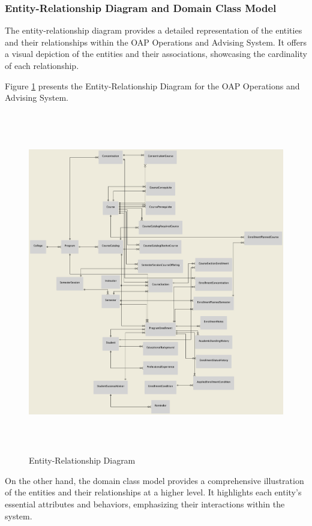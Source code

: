 \documentclass[12pt]{article}
\begin{document}
\subsubsection{Entity-Relationship Diagram and Domain Class Model}
The entity-relationship diagram provides a detailed representation of the entities and their relationships within the OAP Operations and Advising System. It offers a visual depiction of the entities and their associations, showcasing the cardinality of each relationship.

Figure \ref{fig:entity_relationship_diagram} presents the Entity-Relationship Diagram for the OAP Operations and Advising System.

\begin{figure}[ht]
    \centering
    \includegraphics[width=15cm,height=15cm]{entity-relationship-diagram}
    \caption{Entity-Relationship Diagram}
    \label{fig:entity_relationship_diagram}
\end{figure}

On the other hand, the domain class model provides a comprehensive illustration of the entities and their relationships at a higher level. It highlights each entity's essential attributes and behaviors, emphasizing their interactions within the system.
\end{document}
